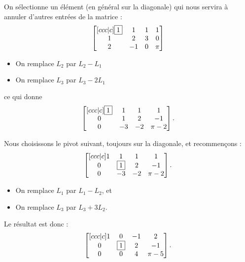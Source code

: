 \begin{frame}
  On sélectionne un élément (en général sur la diagonale) qui nous servira à annuler d'autres entrées de la matrice :\pause{}
  \begin{equation*}
    \begin{bmatrix}[ccc|c]
      \fbox{1} & 1 & 1 & 1\\
      1 & 2 & 3 & 0\\
      2 &-1 & 0 & \pi
    \end{bmatrix}
  \end{equation*}\pause{}
  \begin{itemize}
  \item On remplace \(L_{2}\) par \(L_{2} - L_{1}\)\pause{}
  \item On remplace \(L_{3}\) par \(L_{3} - 2 L_{1}\)
  \end{itemize}\pause{}
  ce qui donne
  \begin{equation*}
    \begin{bmatrix}[ccc|c]
      \fbox{1} & 1 & 1 & 1\\
      0 & 1 & 2 & -1\\
      0 &-3 & -2 & \pi -2
    \end{bmatrix}.
  \end{equation*}
\end{frame}

\begin{frame}
  Nous choisissons le pivot suivant, toujours sur la diagonale, et recommençons :
  \begin{equation*}
    \begin{bmatrix}[ccc|c]
      1 & 1 & 1 & 1\\
      0 & \fbox{1} & 2 & -1\\
      0 &-3 & -2 & \pi -2
    \end{bmatrix}.
  \end{equation*}\pause{}
  \begin{itemize}
  \item On remplace \(L_{1}\) par \(L_{1} - L_{2}\), et\pause{}
  \item On remplace \(L_{3}\) par \(L_{3} + 3 L_{2}\).\pause{}
  \end{itemize}\pause{}
  Le résultat est donc :\pause{}
  \begin{equation*}
    \begin{bmatrix}[ccc|c]
      1 & 0        & -1 & 2  \\
      0 & \fbox{1} & 2  & -1 \\
      0 & 0 & 4 & \pi -5
    \end{bmatrix}.
  \end{equation*}
\end{frame}

